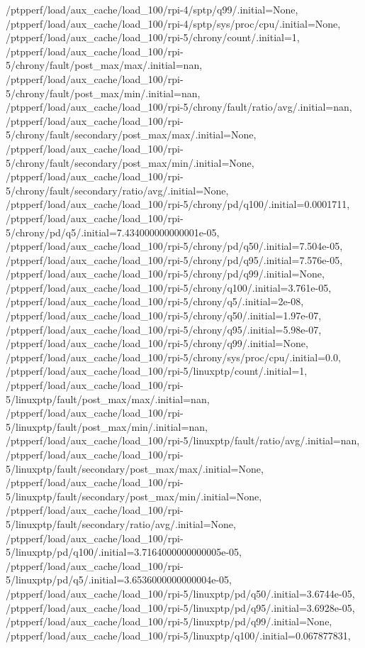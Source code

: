 {    /ptpperf/load/aux_cache/load_100/rpi-4/sptp/q99/.initial=None,
    /ptpperf/load/aux_cache/load_100/rpi-4/sptp/sys/proc/cpu/.initial=None,
    /ptpperf/load/aux_cache/load_100/rpi-5/chrony/count/.initial=1,
    /ptpperf/load/aux_cache/load_100/rpi-5/chrony/fault/post_max/max/.initial=nan,
    /ptpperf/load/aux_cache/load_100/rpi-5/chrony/fault/post_max/min/.initial=nan,
    /ptpperf/load/aux_cache/load_100/rpi-5/chrony/fault/ratio/avg/.initial=nan,
    /ptpperf/load/aux_cache/load_100/rpi-5/chrony/fault/secondary/post_max/max/.initial=None,
    /ptpperf/load/aux_cache/load_100/rpi-5/chrony/fault/secondary/post_max/min/.initial=None,
    /ptpperf/load/aux_cache/load_100/rpi-5/chrony/fault/secondary/ratio/avg/.initial=None,
    /ptpperf/load/aux_cache/load_100/rpi-5/chrony/pd/q100/.initial=0.0001711,
    /ptpperf/load/aux_cache/load_100/rpi-5/chrony/pd/q5/.initial=7.434000000000001e-05,
    /ptpperf/load/aux_cache/load_100/rpi-5/chrony/pd/q50/.initial=7.504e-05,
    /ptpperf/load/aux_cache/load_100/rpi-5/chrony/pd/q95/.initial=7.576e-05,
    /ptpperf/load/aux_cache/load_100/rpi-5/chrony/pd/q99/.initial=None,
    /ptpperf/load/aux_cache/load_100/rpi-5/chrony/q100/.initial=3.761e-05,
    /ptpperf/load/aux_cache/load_100/rpi-5/chrony/q5/.initial=2e-08,
    /ptpperf/load/aux_cache/load_100/rpi-5/chrony/q50/.initial=1.97e-07,
    /ptpperf/load/aux_cache/load_100/rpi-5/chrony/q95/.initial=5.98e-07,
    /ptpperf/load/aux_cache/load_100/rpi-5/chrony/q99/.initial=None,
    /ptpperf/load/aux_cache/load_100/rpi-5/chrony/sys/proc/cpu/.initial=0.0,
    /ptpperf/load/aux_cache/load_100/rpi-5/linuxptp/count/.initial=1,
    /ptpperf/load/aux_cache/load_100/rpi-5/linuxptp/fault/post_max/max/.initial=nan,
    /ptpperf/load/aux_cache/load_100/rpi-5/linuxptp/fault/post_max/min/.initial=nan,
    /ptpperf/load/aux_cache/load_100/rpi-5/linuxptp/fault/ratio/avg/.initial=nan,
    /ptpperf/load/aux_cache/load_100/rpi-5/linuxptp/fault/secondary/post_max/max/.initial=None,
    /ptpperf/load/aux_cache/load_100/rpi-5/linuxptp/fault/secondary/post_max/min/.initial=None,
    /ptpperf/load/aux_cache/load_100/rpi-5/linuxptp/fault/secondary/ratio/avg/.initial=None,
    /ptpperf/load/aux_cache/load_100/rpi-5/linuxptp/pd/q100/.initial=3.7164000000000005e-05,
    /ptpperf/load/aux_cache/load_100/rpi-5/linuxptp/pd/q5/.initial=3.6536000000000004e-05,
    /ptpperf/load/aux_cache/load_100/rpi-5/linuxptp/pd/q50/.initial=3.6744e-05,
    /ptpperf/load/aux_cache/load_100/rpi-5/linuxptp/pd/q95/.initial=3.6928e-05,
    /ptpperf/load/aux_cache/load_100/rpi-5/linuxptp/pd/q99/.initial=None,
    /ptpperf/load/aux_cache/load_100/rpi-5/linuxptp/q100/.initial=0.067877831,
}
